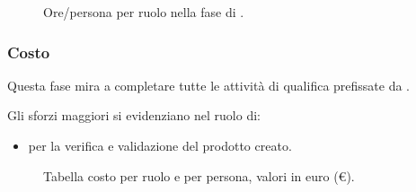 \begin{figure}[H]
\caption{Ore/persona per ruolo nella fase di \VV.}
\label{fig:vv2}

\end{figure}


\pagebreak

\subsubsection{Costo \VV}
\introcosto{\VV}
Questa fase mira a completare tutte le attività di qualifica prefissate da {\hx}.

Gli sforzi maggiori si evidenziano nel ruolo di:
\begin{itemize}
\item {\Vx} per la verifica e validazione del prodotto creato.
\end{itemize}

\begin{figure}[H]
\label{tab:vv}

  \caption{Tabella costo {\VV} per ruolo e per persona, valori in euro (\euro).}
\end{figure}

